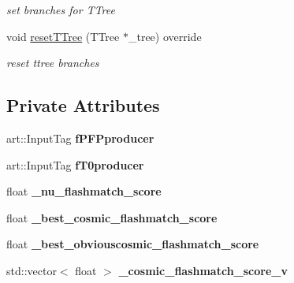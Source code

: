 \begin{DoxyCompactItemize}
\begin{DoxyCompactList}\small\item\em set branches for T\-Tree \end{DoxyCompactList}\item 
\hypertarget{classanalysis_1_1FlashMatching_ac9f3186d0a7acb4723959687710f7bab}{void \hyperlink{classanalysis_1_1FlashMatching_ac9f3186d0a7acb4723959687710f7bab}{reset\-T\-Tree} (T\-Tree $\ast$\-\_\-tree) override}\label{classanalysis_1_1FlashMatching_ac9f3186d0a7acb4723959687710f7bab}

\begin{DoxyCompactList}\small\item\em reset ttree branches \end{DoxyCompactList}\end{DoxyCompactItemize}
\subsection*{Private Attributes}
\begin{DoxyCompactItemize}
\item 
\hypertarget{classanalysis_1_1FlashMatching_ab08a41fbfa79153063d300f2f00cf2ce}{art\-::\-Input\-Tag {\bfseries f\-P\-F\-Pproducer}}\label{classanalysis_1_1FlashMatching_ab08a41fbfa79153063d300f2f00cf2ce}

\item 
\hypertarget{classanalysis_1_1FlashMatching_adc40aeaba0f5c6e5db982a2630a5c869}{art\-::\-Input\-Tag {\bfseries f\-T0producer}}\label{classanalysis_1_1FlashMatching_adc40aeaba0f5c6e5db982a2630a5c869}

\item 
\hypertarget{classanalysis_1_1FlashMatching_ad5378659d44adbf60961370b7e09059f}{float {\bfseries \-\_\-nu\-\_\-flashmatch\-\_\-score}}\label{classanalysis_1_1FlashMatching_ad5378659d44adbf60961370b7e09059f}

\item 
\hypertarget{classanalysis_1_1FlashMatching_a1272dc1455e89eea53d439c1789562c5}{float {\bfseries \-\_\-best\-\_\-cosmic\-\_\-flashmatch\-\_\-score}}\label{classanalysis_1_1FlashMatching_a1272dc1455e89eea53d439c1789562c5}

\item 
\hypertarget{classanalysis_1_1FlashMatching_a37d29c4362498710cb68584518ee4ec6}{float {\bfseries \-\_\-best\-\_\-obviouscosmic\-\_\-flashmatch\-\_\-score}}\label{classanalysis_1_1FlashMatching_a37d29c4362498710cb68584518ee4ec6}

\item 
\hypertarget{classanalysis_1_1FlashMatching_a4a23f572bbc5503c07fdd410d7742598}{std\-::vector$<$ float $>$ {\bfseries \-\_\-cosmic\-\_\-flashmatch\-\_\-score\-\_\-v}}\label{classanalysis_1_1FlashMatching_a4a23f572bbc5503c07fdd410d7742598}

\end{DoxyCompactItemize}



